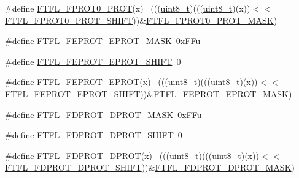 \begin{DoxyCompactItemize}
\item 
\#define \hyperlink{group___f_t_f_l___register___masks_gab744f37414e482c23b05081b9fe0f395}{F\+T\+F\+L\+\_\+\+F\+P\+R\+O\+T0\+\_\+\+P\+R\+OT}(x)                                        ~(((\hyperlink{_p_e___types_8h_aba7bc1797add20fe3efdf37ced1182c5}{uint8\+\_\+t})(((\hyperlink{_p_e___types_8h_aba7bc1797add20fe3efdf37ced1182c5}{uint8\+\_\+t})(x))$<$$<$\hyperlink{group___f_t_f_l___register___masks_gaa187bf5bd9042ecb56239610b9636ad8}{F\+T\+F\+L\+\_\+\+F\+P\+R\+O\+T0\+\_\+\+P\+R\+O\+T\+\_\+\+S\+H\+I\+FT}))\&\hyperlink{group___f_t_f_l___register___masks_ga646d72cc3ed2260faa773c4aa7950448}{F\+T\+F\+L\+\_\+\+F\+P\+R\+O\+T0\+\_\+\+P\+R\+O\+T\+\_\+\+M\+A\+SK})
\item 
\#define \hyperlink{group___f_t_f_l___register___masks_gaf8050cf8129009b1eec291d295ea4767}{F\+T\+F\+L\+\_\+\+F\+E\+P\+R\+O\+T\+\_\+\+E\+P\+R\+O\+T\+\_\+\+M\+A\+SK}~0x\+F\+Fu
\item 
\#define \hyperlink{group___f_t_f_l___register___masks_ga448539d5bf3dabcad04582543d4b31d6}{F\+T\+F\+L\+\_\+\+F\+E\+P\+R\+O\+T\+\_\+\+E\+P\+R\+O\+T\+\_\+\+S\+H\+I\+FT}~0
\item 
\#define \hyperlink{group___f_t_f_l___register___masks_gaa41070c8363819ecef557a277c6d3941}{F\+T\+F\+L\+\_\+\+F\+E\+P\+R\+O\+T\+\_\+\+E\+P\+R\+OT}(x)                                      ~(((\hyperlink{_p_e___types_8h_aba7bc1797add20fe3efdf37ced1182c5}{uint8\+\_\+t})(((\hyperlink{_p_e___types_8h_aba7bc1797add20fe3efdf37ced1182c5}{uint8\+\_\+t})(x))$<$$<$\hyperlink{group___f_t_f_l___register___masks_ga448539d5bf3dabcad04582543d4b31d6}{F\+T\+F\+L\+\_\+\+F\+E\+P\+R\+O\+T\+\_\+\+E\+P\+R\+O\+T\+\_\+\+S\+H\+I\+FT}))\&\hyperlink{group___f_t_f_l___register___masks_gaf8050cf8129009b1eec291d295ea4767}{F\+T\+F\+L\+\_\+\+F\+E\+P\+R\+O\+T\+\_\+\+E\+P\+R\+O\+T\+\_\+\+M\+A\+SK})
\item 
\#define \hyperlink{group___f_t_f_l___register___masks_ga308c1d923b4ad70d0ac4445e8cb09ac0}{F\+T\+F\+L\+\_\+\+F\+D\+P\+R\+O\+T\+\_\+\+D\+P\+R\+O\+T\+\_\+\+M\+A\+SK}~0x\+F\+Fu
\item 
\#define \hyperlink{group___f_t_f_l___register___masks_ga36e2c6a1672ab6425d570dc3b4d6b812}{F\+T\+F\+L\+\_\+\+F\+D\+P\+R\+O\+T\+\_\+\+D\+P\+R\+O\+T\+\_\+\+S\+H\+I\+FT}~0
\item 
\#define \hyperlink{group___f_t_f_l___register___masks_ga06896c18fa0af8a7f0fd652784fcda66}{F\+T\+F\+L\+\_\+\+F\+D\+P\+R\+O\+T\+\_\+\+D\+P\+R\+OT}(x)                                      ~(((\hyperlink{_p_e___types_8h_aba7bc1797add20fe3efdf37ced1182c5}{uint8\+\_\+t})(((\hyperlink{_p_e___types_8h_aba7bc1797add20fe3efdf37ced1182c5}{uint8\+\_\+t})(x))$<$$<$\hyperlink{group___f_t_f_l___register___masks_ga36e2c6a1672ab6425d570dc3b4d6b812}{F\+T\+F\+L\+\_\+\+F\+D\+P\+R\+O\+T\+\_\+\+D\+P\+R\+O\+T\+\_\+\+S\+H\+I\+FT}))\&\hyperlink{group___f_t_f_l___register___masks_ga308c1d923b4ad70d0ac4445e8cb09ac0}{F\+T\+F\+L\+\_\+\+F\+D\+P\+R\+O\+T\+\_\+\+D\+P\+R\+O\+T\+\_\+\+M\+A\+SK})
\end{DoxyCompactItemize}


